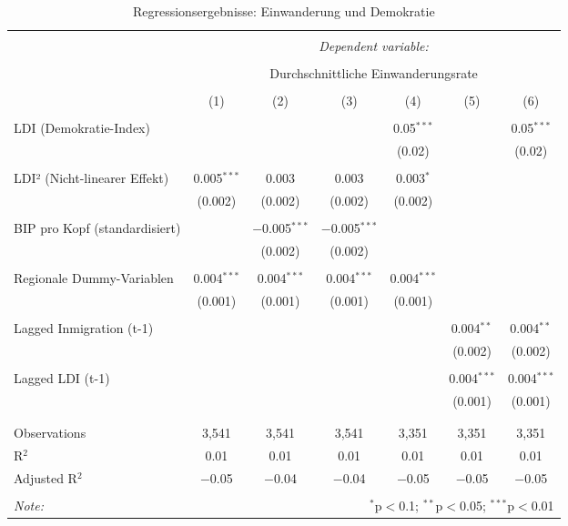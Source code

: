 
\begin{table}[!htbp] \centering 
  \caption{Regressionsergebnisse: Einwanderung und Demokratie} 
  \label{} 
\scriptsize 
\begin{tabular}{@{\extracolsep{2pt}}lcccccc} 
\\[-1.8ex]\hline 
\hline \\[-1.8ex] 
 & \multicolumn{6}{c}{\textit{Dependent variable:}} \\ 
\cline{2-7} 
\\[-1.8ex] & \multicolumn{6}{c}{Durchschnittliche Einwanderungsrate} \\ 
\\[-1.8ex] & (1) & (2) & (3) & (4) & (5) & (6)\\ 
\hline \\[-1.8ex] 
 LDI (Demokratie-Index) &  &  &  & 0.05$^{***}$ &  & 0.05$^{***}$ \\ 
  &  &  &  & (0.02) &  & (0.02) \\ 
  & & & & & & \\ 
 LDI² (Nicht-linearer Effekt) & 0.005$^{***}$ & 0.003 & 0.003 & 0.003$^{*}$ &  &  \\ 
  & (0.002) & (0.002) & (0.002) & (0.002) &  &  \\ 
  & & & & & & \\ 
 BIP pro Kopf (standardisiert) &  & $-$0.005$^{***}$ & $-$0.005$^{***}$ &  &  &  \\ 
  &  & (0.002) & (0.002) &  &  &  \\ 
  & & & & & & \\ 
 Regionale Dummy-Variablen & 0.004$^{***}$ & 0.004$^{***}$ & 0.004$^{***}$ & 0.004$^{***}$ &  &  \\ 
  & (0.001) & (0.001) & (0.001) & (0.001) &  &  \\ 
  & & & & & & \\ 
 Lagged Inmigration (t-1) &  &  &  &  & 0.004$^{**}$ & 0.004$^{**}$ \\ 
  &  &  &  &  & (0.002) & (0.002) \\ 
  & & & & & & \\ 
 Lagged LDI (t-1) &  &  &  &  & 0.004$^{***}$ & 0.004$^{***}$ \\ 
  &  &  &  &  & (0.001) & (0.001) \\ 
  & & & & & & \\ 
\hline \\[-1.8ex] 
Observations & 3,541 & 3,541 & 3,541 & 3,351 & 3,351 & 3,351 \\ 
R$^{2}$ & 0.01 & 0.01 & 0.01 & 0.01 & 0.01 & 0.01 \\ 
Adjusted R$^{2}$ & $-$0.05 & $-$0.04 & $-$0.04 & $-$0.05 & $-$0.05 & $-$0.05 \\ 
\hline 
\hline \\[-1.8ex] 
\textit{Note:}  & \multicolumn{6}{r}{$^{*}$p$<$0.1; $^{**}$p$<$0.05; $^{***}$p$<$0.01} \\ 
\end{tabular} 
\end{table} 
